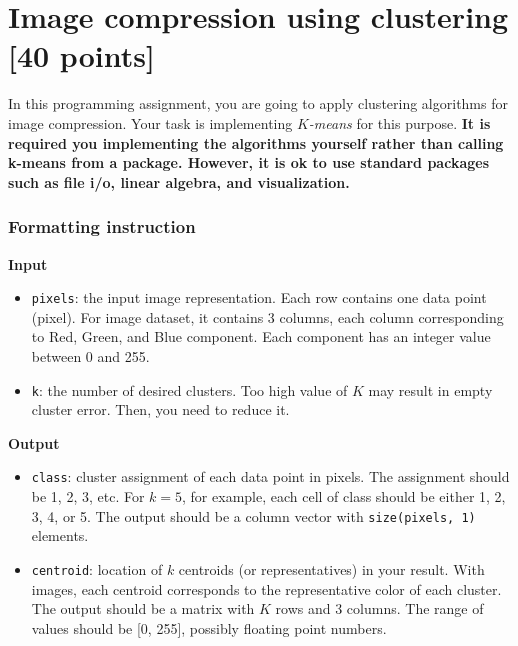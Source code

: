 \documentclass[twoside,10pt]{article}
\begin{document}
\section{Image compression using clustering [40 points]}

In this programming assignment, you are going to apply clustering algorithms for image compression. Your task is implementing \emph{$K$-means} for this purpose.  {\bf It is required you implementing the algorithms yourself rather than calling k-means from a package. However, it is ok to use standard packages such as file i/o,  linear algebra, and visualization.} 


\subsubsection*{Formatting instruction}


\textbf{Input}
\begin{itemize}
  \item \texttt{pixels}: the input image representation. Each row contains one data point (pixel). For image dataset, it contains 3 columns, each column corresponding to Red, Green, and Blue component. Each component has an integer value between 0 and 255.
  \item \texttt{k}: the number of desired clusters. Too high value of $K$ may result in empty cluster error. Then, you need to reduce it.
\end{itemize}

\textbf{Output}
\begin{itemize}
  \item \texttt{class}: cluster assignment of each data point in pixels. The assignment should be 1, 2, 3, etc. For $k = 5$, for example, each cell of class should be either 1, 2, 3, 4, or 5. The output should be a column vector with \texttt{size(pixels, 1)} elements.
  \item \texttt{centroid}: location of $k$ centroids (or representatives) in your result. With images, each centroid corresponds to the representative color of each cluster. The output should be a matrix with $K$ rows and 3 columns. The range of values should be [0, 255], possibly floating point numbers.
\end{itemize}
\end{document}
